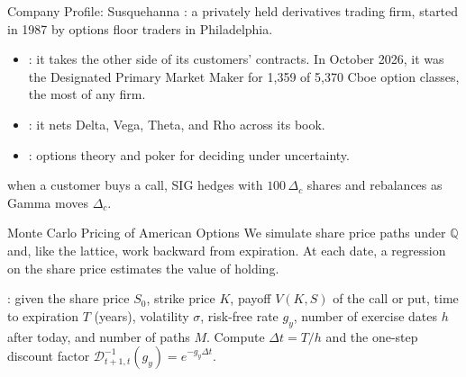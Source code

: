 \documentclass[aspectratio=169,11pt]{beamer}
\newcommand{\Q}{\mathbb{Q}}
\newcommand{\Dstep}{\mathcal{D}^{-1}_{t+1,t}(g_{y})}
\begin{document}
\begin{frame}{Company Profile: Susquehanna}
  \href{https://sig.com/about/}{}: a privately held
  derivatives trading firm, started in 1987 by options floor traders in
  Philadelphia.
  \begin{itemize}\setlength{\itemsep}{0.4em}
    \item {}: it takes the other side of its
      customers' contracts. In October 2026, it was the Designated Primary Market Maker
      for 1,359 of 5,370 Cboe option classes, the most of any firm.
    \item {}: it nets Delta, Vega, Theta, and Rho
      across its book.
    \item {}: options theory and poker for deciding under
      uncertainty.
  \end{itemize}
  \vspace{0.3em}
  \textbf{} when a customer buys a call, SIG hedges with
  $100\,\Delta_{c}$ shares and rebalances as Gamma moves $\Delta_{c}$.
\end{frame}

\begin{frame}{Monte Carlo Pricing of American Options}
  We simulate share price paths under $\Q$ and, like the lattice, work backward
  from expiration. At each date, a regression on the share price estimates the
  value of holding.

  \vspace{0.6em}
  : given the share price $S_{0}$, strike price $K$, payoff
  $V(K,S)$ of the call or put, time to expiration $T$ (years), volatility
  $\sigma$, risk-free rate $g_{y}$, number of exercise dates $h$ after today,
  and number of paths $M$. Compute $\Delta t=T/h$ and the one-step discount
  factor $\Dstep=e^{-g_{y}\Delta t}$.
\end{frame}
\end{document}
